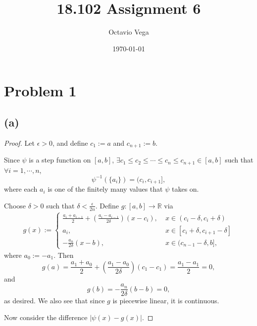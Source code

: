\documentclass{article}
\title{18.102 Assignment 6}
\author{Octavio Vega}
\date\today
\newcommand{\R}{\mathbb{R}} %
\begin{document}
\maketitle
	
\section*{Problem 1}
\subsection*{(a)}
\begin{proof}
	Let $\epsilon > 0$, and define $c_1 := a$ and $c_{n+1} := b$. 
	
	Since $\psi$ is a step function on $[a, b]$, $\exists c_1 \leq c_2 \leq \cdots \leq c_n \leq c_{n+1} \in [a, b]$ such that $\forall i = 1, \cdots, n$,
	\begin{equation}\label{psi_inverse}
		\psi^{-1}(\{a_i\}) = (c_i, c_{i+1}],
	\end{equation}
	where each $a_i$ is one of the finitely many values that $\psi$ takes on. 
	
	Choose $\delta > 0$ such that $\delta < \frac{\epsilon}{2n}$. Define $g: [a, b] \rightarrow \R$ via
	\begin{align}
		g(x) := \begin{cases}
			\frac{a_i + a_{i-1}}{2} + \left(\frac{a_i - a_{i-1}}{2\delta}\right)(x-c_i), \; &x \in (c_i - \delta, c_i + \delta) \\
			a_i, \; &x \in [c_i + \delta, c_{i+1}-\delta] \\
			-\frac{a_n}{2\delta}(x-b), \; &x \in (c_{n-1}-\delta, b],
		\end{cases}
	\end{align}
	where $a_0 := -a_1$. Then
	\begin{equation}
		g(a) = \frac{a_1 + a_0}{2} + \left(\frac{a_1 - a_0}{2\delta}\right)(c_1 - c_1) = \frac{a_1 - a_1}{2} = 0,
	\end{equation}
	and
	\begin{equation}
		g(b) = -\frac{a_n}{2\delta}(b-b) = 0,
	\end{equation}
	as desired. We also see that since $g$ is piecewise linear, it is continuous. 
	
	Now consider the difference $|\psi(x) - g(x)|$.
	

\end{proof}
\end{document}
